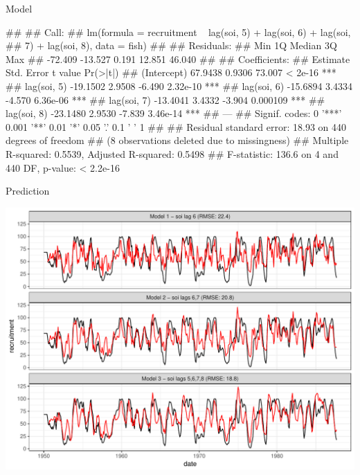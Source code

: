\documentclass[11pt,ignorenonframetext,]{beamer}
\let\oldverbatim\verbatim
\let\endoldverbatim\endverbatim
\renewenvironment{verbatim}{\footnotesize\begin{spacing}{0.9}\oldverbatim}{\endoldverbatim\end{spacing}}
\begin{document}
\begin{frame}[fragile]{Model}

\begin{verbatim}
## 
## Call:
## lm(formula = recruitment ~ lag(soi, 5) + lag(soi, 6) + lag(soi, 
##     7) + lag(soi, 8), data = fish)
## 
## Residuals:
##     Min      1Q  Median      3Q     Max 
## -72.409 -13.527   0.191  12.851  46.040 
## 
## Coefficients:
##             Estimate Std. Error t value Pr(>|t|)    
## (Intercept)  67.9438     0.9306  73.007  < 2e-16 ***
## lag(soi, 5) -19.1502     2.9508  -6.490 2.32e-10 ***
## lag(soi, 6) -15.6894     3.4334  -4.570 6.36e-06 ***
## lag(soi, 7) -13.4041     3.4332  -3.904 0.000109 ***
## lag(soi, 8) -23.1480     2.9530  -7.839 3.46e-14 ***
## ---
## Signif. codes:  0 '***' 0.001 '**' 0.01 '*' 0.05 '.' 0.1 ' ' 1
## 
## Residual standard error: 18.93 on 440 degrees of freedom
##   (8 observations deleted due to missingness)
## Multiple R-squared:  0.5539, Adjusted R-squared:  0.5498 
## F-statistic: 136.6 on 4 and 440 DF,  p-value: < 2.2e-16
\end{verbatim}

\end{frame}

\begin{frame}{Prediction}

\begin{center}\includegraphics{Lec7_files/figure-beamer/unnamed-chunk-8-1} \end{center}

\end{frame}
\end{document}

